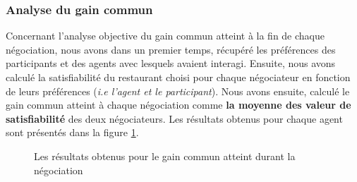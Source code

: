 	\subsubsection{Analyse du gain commun } Concernant l'analyse objective du gain commun atteint à la fin de chaque négociation, nous avons dans un premier temps, récupéré les préférences des participants et des agents avec lesquels avaient interagi. 
	Ensuite, nous avons calculé la satisfiabilité du restaurant choisi pour chaque négociateur en fonction de leurs préférences (\textit{i.e l'agent et le participant}). Nous avons ensuite, calculé le gain commun atteint à chaque négociation comme \textbf{la moyenne des valeur de satisfiabilité} des deux négociateurs.  Les résultats obtenus pour chaque agent sont présentés dans la figure \ref{fig:gain}. 
	
		\begin{figure}[h]
		
		
		\caption{Les résultats obtenus pour le gain commun atteint durant la négociation}
		\label{fig:gain}
	\end{figure}

